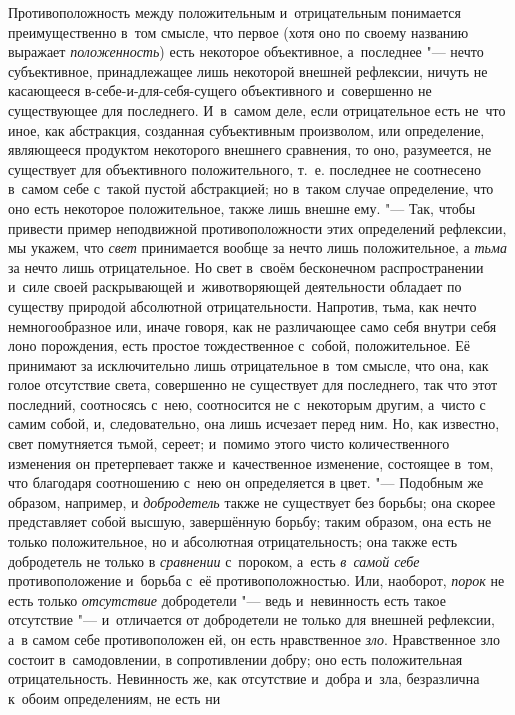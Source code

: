 Противоположность между положительным и~отрицательным понимается
преимущественно в~том смысле, что первое (хотя оно по своему названию
выражает {\em положенность}) есть некоторое
объективное, а~последнее "--- нечто субъективное, принадлежащее лишь некоторой
внешней рефлексии, ничуть не касающееся в-себе-и-для-себя-сущего
объективного и~совершенно не существующее для последнего. И~в~самом деле,
если отрицательное есть не~что иное, как абстракция, созданная субъективным
произволом, или определение, являющееся продуктом некоторого внешнего
сравнения, то оно, разумеется, не существует для объективного
положительного, т.~е. последнее не соотнесено в~самом себе с~такой пустой
абстракцией; но в~таком случае определение, что оно есть некоторое
положительное, также лишь внешне ему. "--- Так, чтобы привести пример
неподвижной противоположности этих определений рефлексии, мы укажем, что
{\em свет} принимается вообще за нечто лишь
положительное, а {\em тьма} за нечто лишь
отрицательное. Но свет в~своём бесконечном распространении и~силе своей
раскрывающей и~животворяющей деятельности обладает по существу природой
абсолютной отрицательности. Напротив, тьма, как нечто немногообразное или,
иначе говоря, как не различающее само себя внутри себя лоно порождения,
есть простое тождественное с~собой, положительное. Её принимают за
исключительно лишь отрицательное в~том смысле, что она, как голое
отсутствие света, совершенно не существует для последнего, так что этот
последний, соотносясь с~нею, соотносится не с~некоторым другим, а~чисто с
самим собой, и, следовательно, она лишь исчезает перед ним. Но, как
известно, свет помутняется тьмой, сереет; и~помимо этого чисто
количественного изменения он претерпевает также и~качественное изменение,
состоящее в~том, что благодаря соотношению с~нею он определяется
в цвет. "--- Подобным же образом, например, и {\em добродетель}
также не существует без борьбы; она скорее представляет собой высшую,
завершённую борьбу; таким образом, она есть не только положительное, но и
абсолютная отрицательность; она также есть добродетель не только в
{\em сравнении} с~пороком, а~есть
{\em в~самой себе} противоположение и~борьба с~её
противоположностью. Или, наоборот, {\em порок} не есть
только {\em отсутствие} добродетели "--- ведь и~невинность
есть такое отсутствие "--- и~отличается от добродетели не только для внешней
рефлексии, а~в самом себе противоположен ей, он есть нравственное
{\em зло}. Нравственное зло состоит в~самодовлении, в
сопротивлении добру; оно есть положительная отрицательность. Невинность же,
как отсутствие и~добра и~зла, безразлична к~обоим определениям, не есть ни
